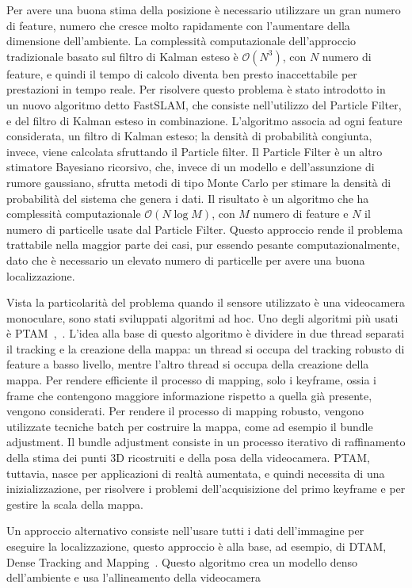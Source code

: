 Per avere una buona stima della posizione è necessario utilizzare un gran numero di feature, numero che cresce molto rapidamente con l'aumentare della dimensione dell'ambiente.
La complessità computazionale dell'approccio tradizionale basato sul filtro di Kalman esteso è $\mathcal{O}(N^3)$, con $N$ numero di feature, e quindi il tempo di calcolo diventa ben presto inaccettabile per prestazioni in tempo reale.
Per risolvere questo problema è stato introdotto in~\cite{Montemerlo02a} un nuovo algoritmo detto FastSLAM, che consiste nell'utilizzo del Particle Filter, e del filtro di Kalman esteso in combinazione. L'algoritmo associa ad ogni feature considerata, un filtro di Kalman esteso; la densità di probabilità congiunta, invece, viene calcolata sfruttando il Particle filter. 
Il Particle Filter è un altro stimatore Bayesiano ricorsivo, che, invece di un modello e dell'assunzione di rumore gaussiano, sfrutta metodi di tipo Monte Carlo per stimare la densità di probabilità del sistema che genera i dati.
Il risultato è un algoritmo che ha complessità computazionale $\mathcal{O}(N\log M)$, con $M$ numero di feature e $N$ il numero di particelle usate dal Particle Filter. 
Questo approccio rende il problema trattabile nella maggior parte dei casi, pur essendo pesante computazionalmente, dato che è necessario un elevato numero di particelle per avere una buona localizzazione.

Vista la particolarità del problema quando il sensore utilizzato è una videocamera monoculare, sono stati sviluppati algoritmi ad hoc.
Uno degli algoritmi più usati è PTAM~\cite{klein07parallel},~\cite{klein08improving}.
L'idea alla base di questo algoritmo è dividere in due thread separati il tracking e la creazione della mappa: un thread si occupa del tracking robusto di feature a basso livello, mentre l'altro thread si occupa della creazione della mappa. 
Per rendere efficiente il processo di mapping, solo i keyframe, ossia i frame che contengono maggiore informazione rispetto a quella già presente, vengono considerati.
Per rendere il processo di mapping robusto, vengono utilizzate tecniche batch per costruire la mappa, come ad esempio il bundle adjustment. Il bundle adjustment consiste in un processo iterativo di raffinamento della stima dei punti 3D ricostruiti e della posa della videocamera.
PTAM, tuttavia, nasce per applicazioni di realtà aumentata, e quindi necessita di una inizializzazione, per risolvere i problemi dell'acquisizione del primo keyframe e per gestire la scala della mappa.

Un approccio alternativo consiste nell'usare tutti i dati dell'immagine per eseguire la localizzazione, questo approccio è alla base, ad esempio, di DTAM, Dense Tracking and Mapping~\cite{conf/iccv/NewcombeLD11}. Questo algoritmo crea un modello denso dell'ambiente e usa l'allineamento della videocamera

